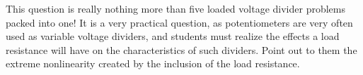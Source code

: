 





This question is really nothing more than five loaded voltage divider problems packed into one!  It is a very practical question, as potentiometers are very often used as variable voltage dividers, and students must realize the effects a load resistance will have on the characteristics of such dividers.  Point out to them the extreme nonlinearity created by the inclusion of the load resistance.




